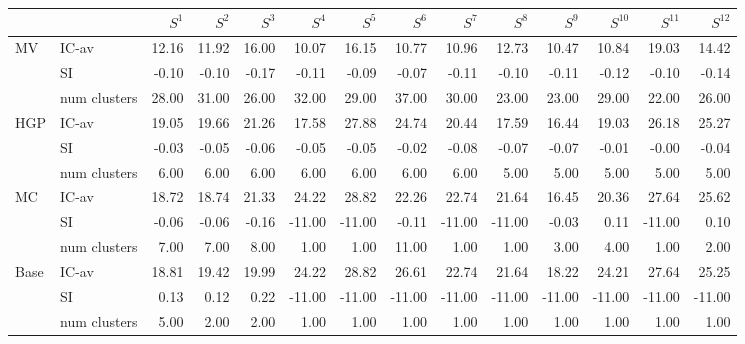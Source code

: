 \begin{tabular}{llrrrrrrrrrrrr}
\toprule
 &  & $S^{1}$ & $S^{2}$ & $S^{3}$ & $S^{4}$ & $S^{5}$ & $S^{6}$ & $S^{7}$ & $S^{8}$ & $S^{9}$ & $S^{10}$ & $S^{11}$ & $S^{12}$ \\
\midrule
\multirow[c]{3}{*}{MV} & IC-av & 12.16 & 11.92 & 16.00 & 10.07 & 16.15 & 10.77 & 10.96 & 12.73 & 10.47 & 10.84 & 19.03 & 14.42 \\
 & SI & -0.10 & -0.10 & -0.17 & -0.11 & -0.09 & -0.07 & -0.11 & -0.10 & -0.11 & -0.12 & -0.10 & -0.14 \\
 & num clusters & 28.00 & 31.00 & 26.00 & 32.00 & 29.00 & 37.00 & 30.00 & 23.00 & 23.00 & 29.00 & 22.00 & 26.00 \\
\multirow[c]{3}{*}{HGP} & IC-av & 19.05 & 19.66 & 21.26 & 17.58 & 27.88 & 24.74 & 20.44 & 17.59 & 16.44 & 19.03 & 26.18 & 25.27 \\
 & SI & -0.03 & -0.05 & -0.06 & -0.05 & -0.05 & -0.02 & -0.08 & -0.07 & -0.07 & -0.01 & -0.00 & -0.04 \\
 & num clusters & 6.00 & 6.00 & 6.00 & 6.00 & 6.00 & 6.00 & 6.00 & 5.00 & 5.00 & 5.00 & 5.00 & 5.00 \\
\multirow[c]{3}{*}{MC} & IC-av & 18.72 & 18.74 & 21.33 & 24.22 & 28.82 & 22.26 & 22.74 & 21.64 & 16.45 & 20.36 & 27.64 & 25.62 \\
 & SI & -0.06 & -0.06 & -0.16 & -11.00 & -11.00 & -0.11 & -11.00 & -11.00 & -0.03 & 0.11 & -11.00 & 0.10 \\
 & num clusters & 7.00 & 7.00 & 8.00 & 1.00 & 1.00 & 11.00 & 1.00 & 1.00 & 3.00 & 4.00 & 1.00 & 2.00 \\
\multirow[c]{3}{*}{Base} & IC-av & 18.81 & 19.42 & 19.99 & 24.22 & 28.82 & 26.61 & 22.74 & 21.64 & 18.22 & 24.21 & 27.64 & 25.25 \\
 & SI & 0.13 & 0.12 & 0.22 & -11.00 & -11.00 & -11.00 & -11.00 & -11.00 & -11.00 & -11.00 & -11.00 & -11.00 \\
 & num clusters & 5.00 & 2.00 & 2.00 & 1.00 & 1.00 & 1.00 & 1.00 & 1.00 & 1.00 & 1.00 & 1.00 & 1.00 \\
\bottomrule
\end{tabular}
